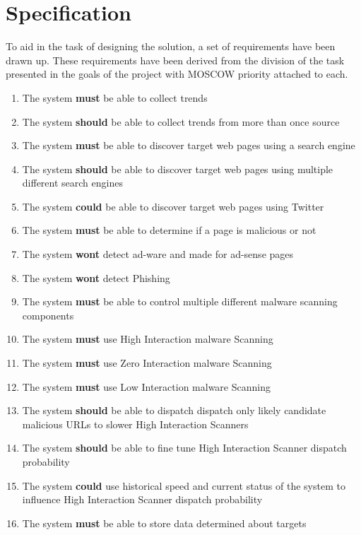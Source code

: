 \section{Specification} To aid in the task of designing the solution, a set of
requirements have been drawn up. These requirements have been derived from the
division of the task presented in the goals of the project with MOSCOW priority
attached to each.

\begin{enumerate} \setlength{\itemsep}{1pt}
    \item The system \textbf{must} be able to collect trends
    \item The system \textbf{should} be able to collect trends from more than once source
    \item The system \textbf{must} be able to discover target web pages using a search engine 
    \item The system \textbf{should} be able to discover target web pages using multiple different search engines
    \item The system \textbf{could} be able to discover target web pages using Twitter
    \item The system \textbf{must} be able to determine if a page is malicious or not
    \item The system \textbf{wont} detect ad-ware and made for ad-sense pages
    \item The system \textbf{wont} detect Phishing
    \item The system \textbf{must} be able to control multiple different malware scanning components
    \item The system \textbf{must} use High Interaction malware Scanning
    \item The system \textbf{must} use Zero Interaction malware Scanning
    \item The system \textbf{must} use Low Interaction malware Scanning
    \item The system \textbf{should} be able to dispatch dispatch only likely candidate malicious URLs to slower High Interaction Scanners
    \item The system \textbf{should} be able to fine tune High Interaction Scanner dispatch probability
    \item The system \textbf{could} use historical speed and current status of the system to influence High Interaction Scanner dispatch probability
    \item The system \textbf{must} be able to store data determined about targets

\end{enumerate}
